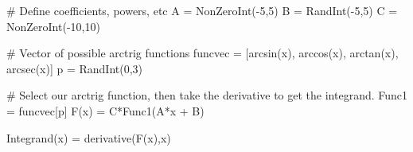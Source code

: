 




\begin{sagesilent}
# Define coefficients, powers, etc
A = NonZeroInt(-5,5)
B = RandInt(-5,5)
C = NonZeroInt(-10,10)


# Vector of possible arctrig functions
funcvec = [arcsin(x), arccos(x), arctan(x), arcsec(x)]
p = RandInt(0,3)

# Select our arctrig function, then take the derivative to get the integrand.
Func1 = funcvec[p]
F(x) = C*Func1(A*x + B)

Integrand(x) = derivative(F(x),x)

\end{sagesilent}



